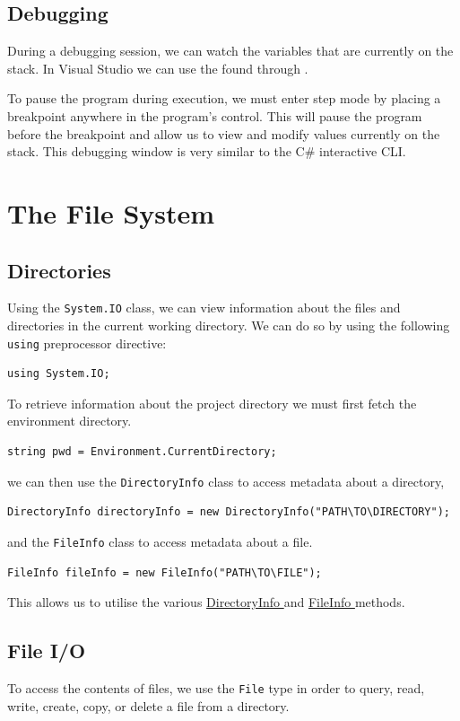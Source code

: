 \documentclass{article}
\begin{document}
\subsection{Debugging}
During a debugging session, we can watch the variables that are currently on the stack.
In Visual Studio we can use the  found through
.

To pause the program during execution, we must enter step mode by placing a breakpoint
anywhere in the program's control. This will pause the program before the breakpoint
and allow us to view and modify values currently on the stack. This debugging window
is very similar to the C\# interactive CLI. %
\section{The File System}
\subsection{Directories}
Using the \lstinline{System.IO} class, we can view information about the files and directories in
the current working directory. We can do so by using the following \lstinline{using} preprocessor directive:
\begin{lstlisting}[numbers=none]
using System.IO;
\end{lstlisting}
To retrieve information about the project directory we must first fetch the environment directory.
\begin{lstlisting}[numbers=none]
string pwd = Environment.CurrentDirectory;
\end{lstlisting}
we can then use the \lstinline{DirectoryInfo} class to access metadata about a directory,
\begin{lstlisting}[numbers=none]
DirectoryInfo directoryInfo = new DirectoryInfo("PATH\TO\DIRECTORY");
\end{lstlisting}
and the \lstinline{FileInfo} class to access metadata about a file.
\begin{lstlisting}[numbers=none]
FileInfo fileInfo = new FileInfo("PATH\TO\FILE");
\end{lstlisting}
This allows us to utilise the various \href{https://docs.microsoft.com/en-us/dotnet/api/system.io.directoryinfo?view=net-6.0#methods}{DirectoryInfo }
and \href{https://docs.microsoft.com/en-us/dotnet/api/system.io.fileinfo?view=net-6.0#methods}{FileInfo } methods.
\subsection{File I/O}
To access the contents of files, we use the \lstinline{File} type in order to query, read, write, create, copy, or delete a
file from a directory.
\end{document}
